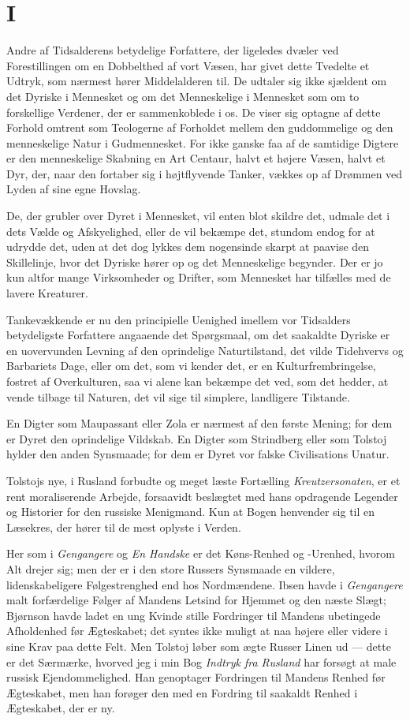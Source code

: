 \documentclass[12pt,a4paper]{article}
\begin{document}
\section*{I}

Andre af Tidsalderens betydelige Forfattere, der ligeledes dvæler ved
Forestillingen om en Dobbelthed af vort Væsen, har givet dette Tvedelte
et Udtryk, som nærmest hører Middelalderen til. De udtaler sig ikke
sjældent om det Dyriske i Mennesket og om det Menneskelige i Mennesket
som om to forskellige Verdener, der er sammenkoblede i os. De viser sig
optagne af dette Forhold omtrent som Teologerne af Forholdet mellem den
guddommelige og den menneskelige Natur i Gudmennesket. For ikke ganske
faa af de samtidige Digtere er den menneskelige Skabning en Art Centaur,
halvt et højere Væsen, halvt et Dyr, der, naar den fortaber sig i
højtflyvende Tanker, vækkes op af Drømmen ved Lyden af sine egne
Hovslag.

De, der grubler over Dyret i Mennesket, vil enten blot skildre det,
udmale det i dets Vælde og Afskyelighed, eller de vil bekæmpe det,
stundom endog for at udrydde det, uden at det dog lykkes dem nogensinde
skarpt at paavise den Skillelinje, hvor det Dyriske hører op og det
Menneskelige begynder. Der er jo kun altfor mange Virksomheder og
Drifter, som Mennesket har tilfælles med de lavere Kreaturer.

Tankevækkende er nu den principielle Uenighed imellem vor Tidsalders
betydeligste Forfattere angaaende det Spørgsmaal, om det saakaldte
Dyriske er en uovervunden Levning af den oprindelige Naturtilstand, det
vilde Tidehvervs og Barbariets Dage, eller om det, som vi kender det, er
en Kulturfrembringelse, fostret af Overkulturen, saa vi alene kan bekæmpe
det ved, som det hedder, at vende tilbage til Naturen, det vil sige til
simplere, landligere Tilstande.

En Digter som Maupassant eller Zola er nærmest af den første Mening; for
dem er Dyret den oprindelige Vildskab. En Digter som Strindberg eller som
Tolstoj hylder den anden Synsmaade; for dem er Dyret vor falske
Civilisations Unatur.

Tolstojs nye, i Rusland forbudte og meget læste Fortælling
\textit{Kreutzersonaten}, er et rent moraliserende Arbejde, forsaavidt
beslægtet med hans opdragende Legender og Historier for den russiske
Menigmand. Kun at Bogen henvender sig til en Læsekres, der hører til de
mest oplyste i Verden.

Her som i \textit{Gengangere} og \textit{En Handske} er det Køns-Renhed og
-Urenhed, hvorom Alt drejer sig; men der er i den store Russers Synsmaade
en vildere, lidenskabeligere Følgestrenghed end hos Nordmændene. Ibsen
havde i \textit{Gengangere} malt forfærdelige Følger af Mandens Letsind
for Hjemmet og den næste Slægt; Bjørnson havde ladet en ung Kvinde stille
Fordringer til Mandens ubetingede Afholdenhed før Ægteskabet; det syntes
ikke muligt at naa højere eller videre i sine Krav paa dette Felt. Men
Tolstoj løber som ægte Russer Linen ud --- dette er det Særmærke, hvorved
jeg i min Bog \textit{Indtryk fra Rusland} har forsøgt at male russisk
Ejendommelighed. Han genoptager Fordringen til Mandens Renhed før
Ægteskabet, men han forøger den med en Fordring til saakaldt Renhed i
Ægteskabet, der er ny.
\end{document}
